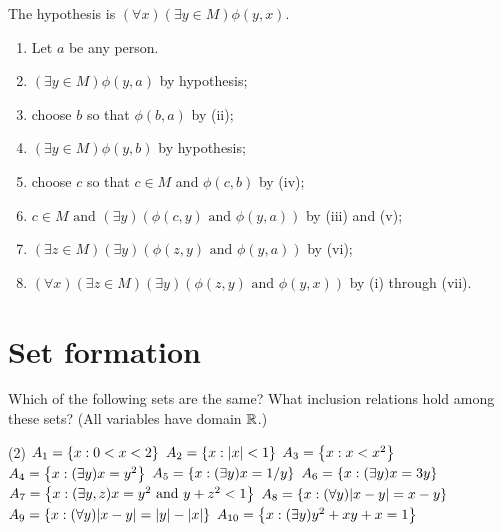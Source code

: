 \documentclass{report}
\renewcommand*{\land}{\text{ and }}
\begin{document}
\begin{solution}
The hypothesis is $(\forall x)(\exists y\in M)\phi(y, x)$.

\begin{enumerate}[label=(\roman*)]
    \item Let $a$ be any person.
    \item \quad $(\exists y\in M)\phi(y, a)$ \hfill by hypothesis;
    \item \quad choose $b$ so that $\phi(b,a)$ \hfill by (ii);
    \item \quad $(\exists y\in M)\phi(y, b)$ \hfill by hypothesis;
    \item \quad choose $c$ so that $c\in M$ and $\phi(c,b)$ \hfill by (iv);
    \item \quad $c\in M\land (\exists y)(\phi(c, y)\land \phi(y, a))$ \hfill by (iii) and (v);
    \item \quad $(\exists z\in M)(\exists y)(\phi(z,y)\land \phi(y, a))$ \hfill by (vi);
    \item $(\forall x)(\exists z\in M)(\exists y)(\phi(z,y)\land \phi(y, x))$ \hfill by (i) through (vii).
\end{enumerate}
\end{solution}

\section{Set formation}

\begin{exercise}
Which of the following sets are the same? What inclusion relations hold among
these sets? (All variables have domain $\mathbb{R}$.)

\begin{tasks}[label=](2)
    \task $A_1=\left\{ x : 0 < x <2 \right\}$
    \task $A_2=\left\{ x : \left\lvert x\right\rvert < 1 \right\}$
    \task $A_3=\left\{ x : x < x^2 \right\}$
    \task $A_4=\left\{ x : (\exists y)x=y^2 \right\}$
    \task $A_5=\left\{ x : (\exists y)x=1/y \right\}$
    \task $A_6=\left\{ x : (\exists y)x=3y \right\}$
    \task $A_7=\setb{x}{(\exists y,z)x=y^2 \land y+z^2 < 1}$
    \task $A_8=\setb{x}{(\forall y)\abs{x-y} = x - y}$
    \task $A_9=\setb{x}{(\forall y)\abs{x-y} = \abs{y} - \abs{x}}$
    \task $A_{10}=\left\{ x : (\exists y)y^2 + xy + x = 1 \right\}$
\end{tasks}
\end{exercise}
\end{document}
